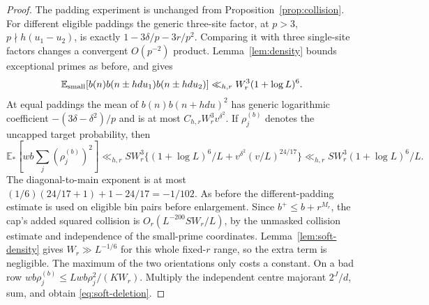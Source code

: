 \documentclass[11pt]{article}
\theoremstyle{definition}
\newcommand{\E}{\mathbb E}
\theoremstyle{remark}
\numberwithin{equation}{section}
\begin{document}
\begin{proof}
The padding experiment is unchanged from Proposition~\ref{prop:collision}.
For different eligible paddings the generic three-site factor, at $p>3$, $p\nmid h(u_1-u_2)$, is exactly
$1-3\delta/p-3r/p^2$. Comparing it with three single-site factors changes a convergent $O(p^{-2})$ product.
Lemma~\ref{lem:density} bounds exceptional primes as before, and gives
\begin{equation}\label{eq:soft-triple}
 \E_{\rm small}[b(n)b(n\pm hdu_1)b(n\pm hdu_2)]
 \ll_{h,r}W_r^3(1+\log L)^6.
\end{equation}
At equal paddings the mean of $b(n)b(n+hdu)^2$ has generic logarithmic coefficient
$-(3\delta-\delta^2)/p$ and is at most $C_{h,r}W_r^3v^{\delta^2}$.
If $\rho_j^{(b)}$ denotes the uncapped target probability, then
\begin{equation}\label{eq:soft-second}
 \E_*[wb\sum_j(\rho_j^{(b)})^2]
 \ll_{h,r}SW_r^3\{(1+\log L)^6/L+v^{\delta^2}(v/L)^{24/17}\}
 \ll_{h,r}SW_r^3(1+\log L)^6/L.
\end{equation}
The diagonal-to-main exponent is at most
$(1/6)(24/17+1)+1-24/17=-1/102$.
As before the different-padding estimate is used on eligible bin pairs before enlargement.
Since $b^+\le b+r^{M_r}$, the cap's added squared collision is
$O_r(L^{-200}SW_r/L)$, by the unmasked collision estimate and independence of the small-prime coordinates.
Lemma~\ref{lem:soft-density} gives $W_r\gg L^{-1/6}$ for this whole fixed-$r$ range, so the extra term is negligible.
The maximum of the two orientations only costs a constant.
On a bad row $wb\rho_j^{(b)}\le Lwb\rho_j^2/(KW_r)$. Multiply the independent centre majorant $2^J/d$,
sum, and obtain \eqref{eq:soft-deletion}.


\end{proof}
\end{document}
